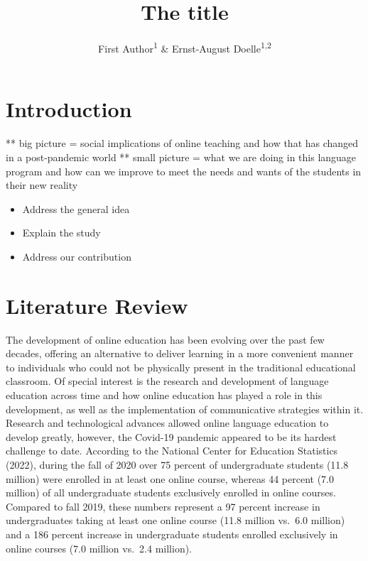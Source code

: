 \documentclass[
  man]{apa6}
\title{The title}
\author{First Author\textsuperscript{1} \& Ernst-August Doelle\textsuperscript{1,2}}
\date{}
\affiliation{\vspace{0.5cm}\textsuperscript{1} Wilhelm-Wundt-University\\\textsuperscript{2} Konstanz Business School}
\begin{document}
\maketitle

\hypertarget{introduction}{%
\section{Introduction}\label{introduction}}

** big picture = social implications of online teaching and how that has changed in a post-pandemic world
** small picture = what we are doing in this language program and how can we improve to meet the needs and wants of the students in their new reality

\begin{itemize}
\item
  Address the general idea
\item
  Explain the study
\item
  Address our contribution
\end{itemize}

\hypertarget{literature-review}{%
\section{Literature Review}\label{literature-review}}

The development of online education has been evolving over the past few decades, offering an alternative to deliver learning in a more convenient manner to individuals who could not be physically present in the traditional educational classroom. Of special interest is the research and development of language education across time and how online education has played a role in this development, as well as the implementation of communicative strategies within it. Research and technological advances allowed online language education to develop greatly, however, the Covid-19 pandemic appeared to be its hardest challenge to date. According to the National Center for Education Statistics (2022), during the fall of 2020 over 75 percent of undergraduate students (11.8 million) were enrolled in at least one online course, whereas 44 percent (7.0 million) of all undergraduate students exclusively enrolled in online courses. Compared to fall 2019, these numbers represent a 97 percent increase in undergraduates taking at least one online course (11.8 million vs.~6.0 million) and a 186 percent increase in undergraduate students enrolled exclusively in online courses (7.0 million vs.~2.4 million).
\end{document}
